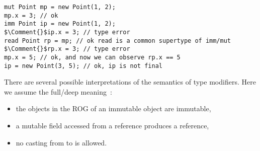 \begin{lstlisting}
mut Point mp = new Point(1, 2);
mp.x = 3; // ok
imm Point ip = new Point(1, 2);
$\Comment{}$ip.x = 3; // type error
read Point rp = mp; // ok read is a common supertype of imm/mut
$\Comment{}$rp.x = 3; // type error
mp.x = 5; // ok, and now we can observe rp.x == 5
ip = new Point(3, 5); // ok, ip is not final
\end{lstlisting}


There are several possible interpretations of the semantics of type modifiers.
Here we assume the full/deep meaning~\cite{ZibinEtAl10}:
\begin{itemize}
  \item the objects in the ROG of an immutable object are immutable,
  \item a mutable field accessed from a \Q@read@ reference produces a \Q@read@ reference,
  \item no casting from \Q@read@ to \Q@mut@ is allowed.
\end{itemize}


